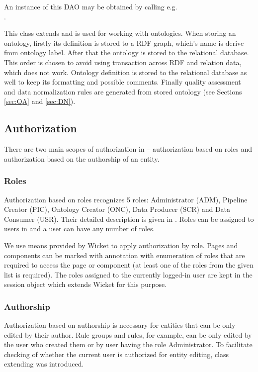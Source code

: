 \begin{description}[style=nextline,font=\ttfamily]
		An instance of this DAO may be obtained by calling e.g.\\
		.
	\item[OntologyDao] This class extends  and is used for working with ontologies. When storing an ontology, firstly its definition is stored to a RDF graph, which's name is derive from ontology label. After that the ontology is stored to the relational database. This order is chosen to avoid using transaction across RDF and relation data, which does not work. Ontology definition is stored to the relational database as well to keep its formatting and possible comments. Finally quality assessment and data normalization rules are generated from stored ontology (see Sections \ref{sec:QA} and \ref{sec:DN}).
\end{description}

\subsection{Authorization}
There are two main scopes of authorization in \odcs -- authorization based on roles and authorization based on the authorship of an entity.

\subsubsection{Roles}
Authorization based on roles recognizes 5 roles: Administrator (ADM), Pipeline Creator (PIC), Ontology Creator (ONC), Data Producer (SCR) and Data Consumer (USR). Their detailed description is given in . Roles can be assigned to users in \FE and a user can have any number of roles.

We use means provided by Wicket to apply authorization by role. Pages and components can be marked with  annotation with enumeration of roles that are required to access the page or component (at least one of the roles from the given list is required). The roles assigned to the currently logged-in user are kept in the session object  which extends Wicket  for this purpose.

\subsubsection{Authorship}
\label{sec:authorshipAuth}
Authorization based on authorship is necessary for entities that can be only edited by their author. Rule groups and rules, for example, can be only edited by the user who created them or by user having the role Administrator. To facilitate checking of whether the current user is authorized for entity editing, class  extending  was introduced.

